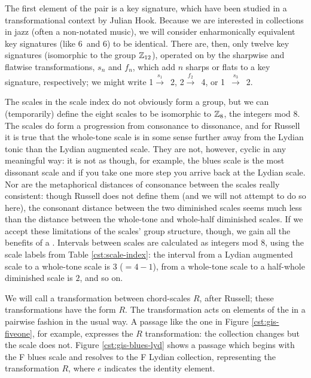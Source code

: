 The first element of the pair is a key signature, which have been studied in a
transformational context by Julian Hook. Because we are interested
in collections in jazz (often a non-notated music), we will consider
enharmonically equivalent key signatures (like 6\sharp\ and 6\kern0.8pt\flat)
to be identical. There are, then, only twelve key signatures (isomorphic to
the group $\mathbb{Z}_{12}$), operated on by the sharpwise and flatwise
transformations, $s_n$ and $f_n$, which add $n$ sharps or flats to a key
signature, respectively; we might write \mbox{1\sharp $\xrightarrow{\ s_1\ }$
  2\sharp}, \mbox{2\flat $\xrightarrow{\ f_2\ }$ 4\flat}, or \mbox{1\flat
  $\xrightarrow{\ s_3\ }$ 2\sharp}.

The scales in the scale index do not obviously form a group, but we can
(temporarily) define the eight scales to be isomorphic to $\mathbb{Z}_8$, the
integers mod 8. The scales do form a progression from consonance to
dissonance, and for Russell it is true that the whole-tone scale is in some
sense further away from the Lydian tonic than the Lydian augmented
scale. They are not, however, cyclic in any meaningful way: it is
not as though, for example, the blues scale is the most dissonant scale and if
you take one more step you arrive back at the Lydian scale. Nor are the
metaphorical distances of consonance between the scales really consistent:
though Russell does not define them (and we will not attempt to do so here), the
consonant distance between the two diminished scales seems much less than the
distance between the whole-tone and whole-half diminished scales.
If we accept these limitations of the scales' group structure, though, we gain
all the benefits of a \gis. Intervals between scales are calculated as
integers mod 8, using the scale labels from Table \ref{cst:scale-index}: the
interval from a Lydian augmented scale to a whole-tone scale is $3$ ($=4-1$),
from a whole-tone scale to a half-whole diminished scale is $2$, and so on.

We will call a transformation between chord-scales $R$, after Russell; these
transformations have the form $R$. The transformation acts on
elements of the \gis in a pairwise fashion in the usual way.
A passage like the one in Figure \ref{cst:gis-fiveone}, for example, expresses the
$R$ transformation: the collection changes but the scale does not.
Figure \ref{cst:gis-blues-lyd} shows a passage which begins with the F blues
scale and resolves to the F Lydian collection, representing the transformation
$R$, where $e$ indicates the identity element.%

